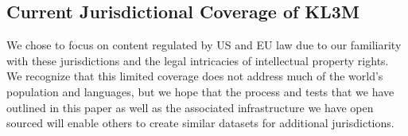 \subsection{Current Jurisdictional Coverage of KL3M}
We chose to focus on content regulated by US and EU law due to our familiarity with these jurisdictions and the legal intricacies of intellectual property rights. We recognize that this limited coverage does not address much of the world's population and languages, but we hope that the process and tests that we have outlined in this paper as well as the associated infrastructure we have open sourced will enable others to create similar datasets for additional jurisdictions.



